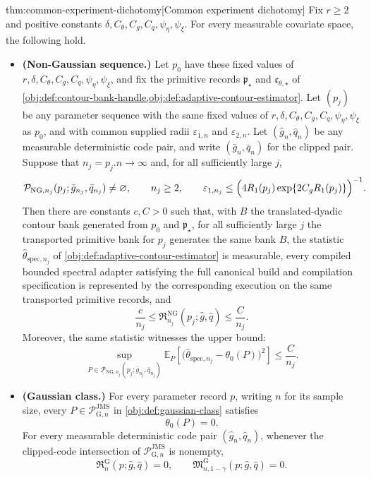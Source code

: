 \documentclass[11pt]{article}
\begin{document}
\begin{theoremv}{thm:common-experiment-dichotomy}[Common experiment dichotomy]
Fix \(r\ge 2\) and positive constants \(\delta,C_{\theta},C_g,C_q,\psi_{\eta},\psi_{\xi}\). For every measurable covariate space, the following hold.

\begin{itemize}
\item \textbf{(Non-Gaussian sequence.)} Let \(p_0\) have these fixed values of \(r,\delta,C_{\theta},C_g,C_q,\psi_{\eta},\psi_{\xi}\), and fix the primitive records \(\mathfrak p_{\star}\) and \(\mathfrak c_{\theta,\star}\) of \cref{obj:def:contour-bank-handle,obj:def:adaptive-contour-estimator}. Let \((p_j)\) be any parameter sequence with the same fixed values of \(r,\delta,C_{\theta},C_g,C_q,\psi_{\eta},\psi_{\xi}\) as \(p_0\), and with common supplied radii \(\varepsilon_{1,n}\) and \(\varepsilon_{2,n}\). Let \((\widehat g_n,\widehat q_n)\) be any measurable deterministic code pair, and write \((\bar g_n,\bar q_n)\) for the clipped pair. Suppose that \(n_j=p_j.n\to\infty\) and, for all sufficiently large \(j\),
\[
\mathcal P_{\mathrm{NG},n_j}(p_j;\bar g_{n_j},\bar q_{n_j})\neq\varnothing,\qquad
n_j\ge 2,\qquad
\varepsilon_{1,n_j}\le
\Bigl(4R_1(p_j)\exp\{2C_gR_1(p_j)\}\Bigr)^{-1}.
\]
Then there are constants \(c,C>0\) such that, with
\(B\) the translated-dyadic contour bank generated from \(p_0\) and \(\mathfrak p_{\star}\), for all sufficiently large \(j\) the transported primitive bank for \(p_j\) generates the same bank \(B\), the statistic \(\widehat\theta_{\mathrm{spec},n_j}\) of \cref{obj:def:adaptive-contour-estimator} is measurable, every compiled bounded spectral adapter satisfying the full canonical build and compilation specification is represented by the corresponding execution on the same transported primitive records, and
\[
\frac{c}{n_j}\le
\mathfrak R_{n_j}^{\mathrm{NG}}(p_j;\widehat g,\widehat q)
\le
\frac{C}{n_j}.
\]
Moreover, the same statistic witnesses the upper bound:
\[
\sup_{P\in \mathcal P_{\mathrm{NG},n_j}(p_j;\bar g_{n_j},\bar q_{n_j})}
\mathbb E_P\!\left[
\bigl(\widehat\theta_{\mathrm{spec},n_j}-\theta_0(P)\bigr)^2
\right]
\le
\frac{C}{n_j}.
\]

\item \textbf{(Gaussian class.)} For every parameter record \(p\), writing \(n\) for its sample size, every \(P\in\mathcal P_{\mathrm G,n}^{\mathrm{JMS}}\) in \cref{obj:def:gaussian-class} satisfies
\[
\theta_0(P)=0.
\]
For every measurable deterministic code pair \((\widehat g_n,\widehat q_n)\), whenever the clipped-code intersection of \(\mathcal P_{\mathrm G,n}^{\mathrm{JMS}}\) is nonempty,
\[
\mathfrak R_{n}^{\mathrm G}(p;\widehat g,\widehat q)=0,
\qquad
\mathfrak M_{n,1-\gamma}^{\mathrm G}(p;\widehat g,\widehat q)=0.
\]
\end{itemize}
\end{theoremv}
\end{document}
